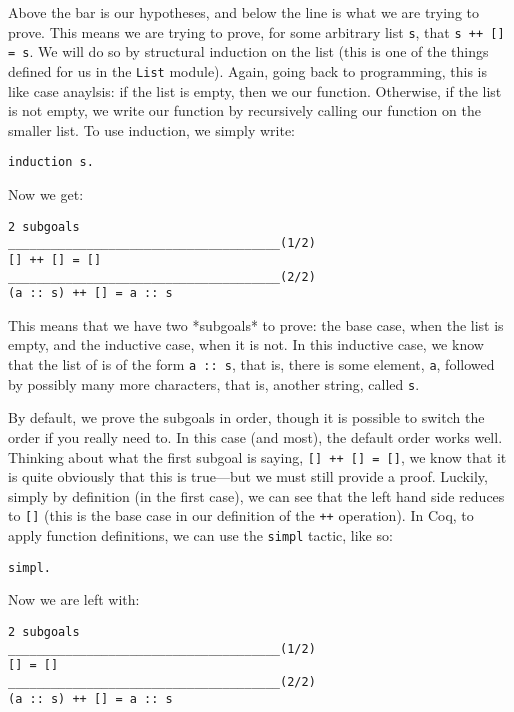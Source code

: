 Above the bar is our hypotheses, and below the line is what we are trying to prove.
This means we are trying to prove, for some arbitrary list \texttt{s}, that \texttt{s ++ [] = s}.
We will do so by structural induction on the list (this is one of the things defined for us in the \texttt{List} module).
Again, going back to programming, this is like case anaylsis: if the list is empty, then we our function.
Otherwise, if the list is not empty, we write our function by recursively calling our function on the smaller list.
To use induction, we simply write:

\begin{verbatim}
induction s.
\end{verbatim}

Now we get:

\begin{verbatim}
2 subgoals
______________________________________(1/2)
[] ++ [] = []
______________________________________(2/2)
(a :: s) ++ [] = a :: s
\end{verbatim}

This means that we have two *subgoals* to prove: the base case, when the list is empty, and the inductive case, when it is not.
In this inductive case, we know that the list of is of the form \texttt{a :: s}, that is, there is some element, \texttt{a}, followed by possibly many more characters, that is, another string, called \texttt{s}.

By default, we prove the subgoals in order, though it is possible to switch the order if you really need to.
In this case (and most), the default order works well.
Thinking about what the first subgoal is saying, \texttt{[] ++ [] = []}, we know that it is quite obviously that this is true---but we must still provide a proof.
Luckily, simply by definition (in the first case), we can see that the left hand side reduces to \texttt{[]} (this is the base case in our definition of the \texttt{++} operation).
In Coq, to apply function definitions, we can use the \texttt{simpl} tactic, like so:

\begin{verbatim}
simpl.
\end{verbatim}

Now we are left with:

\begin{verbatim}
2 subgoals
______________________________________(1/2)
[] = []
______________________________________(2/2)
(a :: s) ++ [] = a :: s
\end{verbatim}

